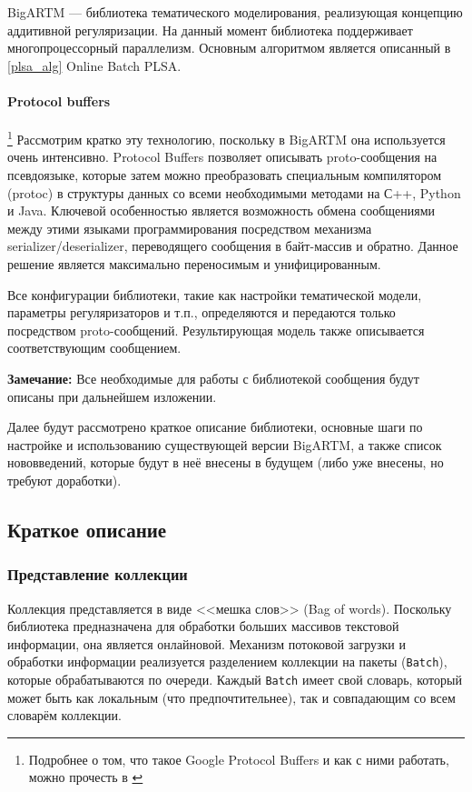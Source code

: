 BigARTM --- библиотека тематического моделирования, реализующая концепцию аддитивной регуляризации. На данный момент библиотека поддерживает многопроцессорный параллелизм. Основным алгоритмом является описанный в \ref{plsa_alg} Online Batch PLSA.

\paragraph{Protocol buffers}
\footnote{Подробнее о том, что такое Google Protocol Buffers и как с ними работать, можно прочесть в \cite{protobuf}}
Рассмотрим кратко эту технологию, поскольку в BigARTM она используется очень интенсивно. Protocol Buffers позволяет описывать proto-сообщения на псевдоязыке, которые затем можно преобразовать специальным компилятором (protoc) в структуры данных со всеми необходимыми методами на С++, Python и Java. Ключевой особенностью является возможность обмена сообщениями между этими языками программирования посредством механизма serializer/deserializer, переводящего сообщения в байт-массив и обратно. Данное решение является максимально переносимым и унифицированным.

Все конфигурации библиотеки, такие как настройки тематической модели, параметры регуляризаторов и т.п., определяются и передаются только посредством proto-сообщений. Результирующая модель также описывается соответствующим сообщением. 

{\bf Замечание:} Все необходимые для работы с библиотекой сообщения будут описаны при дальнейшем изложении.

Далее будут рассмотрено краткое описание библиотеки, основные шаги по настройке и использованию существующей версии BigARTM, а также список нововведений, которые будут в неё внесены в будущем (либо уже внесены, но требуют доработки).

\subsection{Краткое описание}

\subsubsection{Представление коллекции} Коллекция представляется в виде <<мешка слов>> (Bag of words). Поскольку библиотека предназначена для обработки больших массивов текстовой информации, она является онлайновой. Механизм потоковой загрузки и обработки информации реализуется разделением коллекции на пакеты (\verb|Batch|), которые обрабатываются по очереди. Каждый \verb|Batch| имеет свой словарь, который может быть как локальным (что предпочтительнее), так и совпадающим со всем словарём коллекции. 

